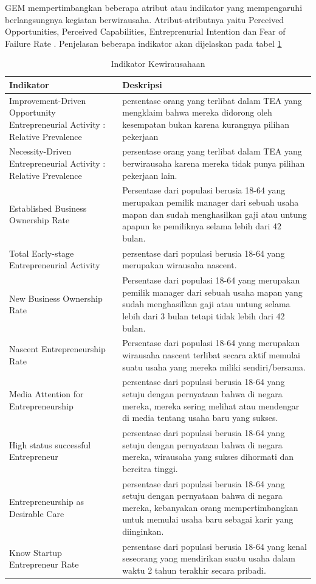GEM mempertimbangkan beberapa atribut atau indikator yang mempengaruhi berlangsungnya kegiatan berwirausaha. Atribut-atributnya yaitu Perceived Opportunities, Perceived Capabilities, Entreprenurial Intention dan Fear of Failure Rate \cite{wirausahaGEM}. Penjelasan beberapa indikator akan dijelaskan pada tabel \ref{tabelindikator}

\begin{table}[H]
\centering
\caption{Indikator Kewirausahaan}
\begin{tabular}{|p{3cm}|p{10cm}|}
\hline
Indikator & Deskripsi\\
\hline
Improvement-Driven Opportunity Entrepreneurial Activity : Relative Prevalence & persentase orang yang terlibat dalam TEA yang mengklaim bahwa mereka didorong oleh kesempatan bukan karena kurangnya pilihan pekerjaan\\
\hline
Necessity-Driven Entrepreneurial Activity : Relative Prevalence & persentase orang yang terlibat dalam TEA yang berwirausaha karena mereka tidak punya pilihan pekerjaan lain.\\
\hline
Established Business Ownership Rate & Persentase dari populasi berusia 18-64 yang merupakan pemilik manager dari sebuah usaha mapan dan sudah menghasilkan gaji atau untung apapun ke pemiliknya selama lebih dari 42 bulan.\\
\hline
Total Early-stage Entrepreneurial Activity & persentase dari populasi berusia 18-64 yang merupakan wirausaha nascent.\\
\hline
New Business Ownership Rate & Persentase dari populasi 18-64 yang merupakan pemilik manager dari sebuah usaha mapan yang sudah menghasilkan gaji atau untung selama lebih dari 3 bulan tetapi tidak lebih dari 42 bulan.\\
\hline
Nascent Entrepreneurship Rate & Persentase dari populasi 18-64 yang merupakan wirausaha nascent terlibat secara aktif memulai suatu usaha yang mereka miliki sendiri/bersama.\\
\hline
Media Attention for Entrepreneurship & persentase dari populasi berusia 18-64 yang setuju dengan pernyataan bahwa di negara mereka, mereka sering melihat atau mendengar di media tentang usaha baru yang sukses.\\
\hline
High status successful Entrepreneur & persentase dari populasi berusia 18-64 yang setuju dengan pernyataan bahwa di negara mereka, wirausaha yang sukses dihormati dan bercitra tinggi.\\
\hline
Entrepreneurship as Desirable Care & persentase dari populasi berusia 18-64 yang setuju dengan pernyataan bahwa di negara mereka, kebanyakan orang mempertimbangkan untuk memulai usaha baru sebagai karir yang diinginkan.\\
\hline
Know Startup Entrepreneur Rate & persentase dari populasi berusia 18-64 yang kenal seseorang yang mendirikan suatu usaha dalam waktu 2 tahun terakhir secara pribadi.\\
\hline
\end{tabular}
\label{tabelindikator}
\end{table}



